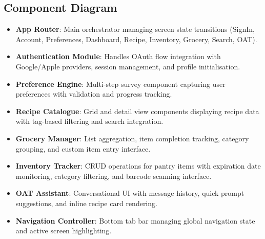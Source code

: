 \documentclass[12pt]{article}
\begin{document}
\subsection{Component Diagram}
\begin{itemize}
  \item \textbf{App Router}: Main orchestrator managing screen state transitions (SignIn, Account, Preferences, Dashboard, Recipe, Inventory, Grocery, Search, OAT).
  \item \textbf{Authentication Module}: Handles OAuth flow integration with Google/Apple providers, session management, and profile initialisation.
  \item \textbf{Preference Engine}: Multi-step survey component capturing user preferences with validation and progress tracking.
  \item \textbf{Recipe Catalogue}: Grid and detail view components displaying recipe data with tag-based filtering and search integration.
  \item \textbf{Grocery Manager}: List aggregation, item completion tracking, category grouping, and custom item entry interface.
  \item \textbf{Inventory Tracker}: CRUD operations for pantry items with expiration date monitoring, category filtering, and barcode scanning interface.
  \item \textbf{OAT Assistant}: Conversational UI with message history, quick prompt suggestions, and inline recipe card rendering.
  \item \textbf{Navigation Controller}: Bottom tab bar managing global navigation state and active screen highlighting.
\end{itemize}
\end{document}
